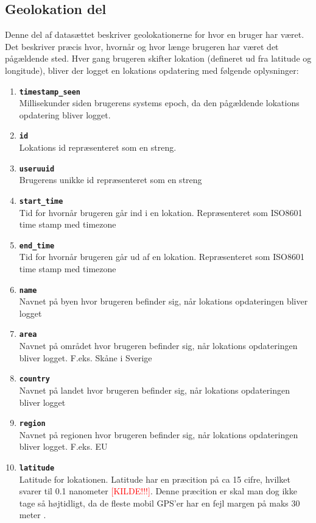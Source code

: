 \subsection{Geolokation del}
Denne del af datasættet beskriver geolokationerne for hvor en bruger har været. Det beskriver præcis hvor, hvornår og hvor længe brugeren har været det pågældende sted. Hver gang brugeren skifter lokation (defineret ud fra latitude og longitude), bliver der logget en lokations opdatering med følgende oplysninger:
\begin{enumerate}
\item \texttt{\textbf{timestamp\_seen}}\\Millisekunder siden brugerens systems epoch, da den pågældende lokations opdatering bliver logget. 
\item \texttt{\textbf{id}}\\Lokations id repræsenteret som en streng. 
\item \texttt{\textbf{useruuid}}\\Brugerens unikke id repræsenteret som en streng
\item \texttt{\textbf{start\_time}}\\Tid for hvornår brugeren går ind i en lokation. Repræsenteret som ISO8601 time stamp med timezone
\item \texttt{\textbf{end\_time}}\\Tid for hvornår brugeren går ud af en lokation. Repræsenteret som ISO8601 time stamp med timezone
\item \texttt{\textbf{name}}\\Navnet på byen hvor brugeren befinder sig, når lokations opdateringen bliver logget
\item \texttt{\textbf{area}}\\Navnet på området hvor brugeren befinder sig, når lokations opdateringen bliver logget. F.eks. Skåne i Sverige
\item \texttt{\textbf{country}}\\Navnet på landet hvor brugeren befinder sig, når lokations opdateringen bliver logget
\item \texttt{\textbf{region}}\\Navnet på regionen hvor brugeren befinder sig, når lokations opdateringen bliver logget. F.eks. EU
\item \texttt{\textbf{latitude}}\\Latitude for lokationen. Latitude har en præcition på ca 15 cifre, hvilket svarer til 0.1 nanometer \textcolor{red}{[KILDE!!!]}. Denne præcition er skal man dog ikke tage så højtidligt, da de fleste mobil GPS'er har en fejl margen på maks 30 meter \cite{NAV:8292634}.  

\end{enumerate}

